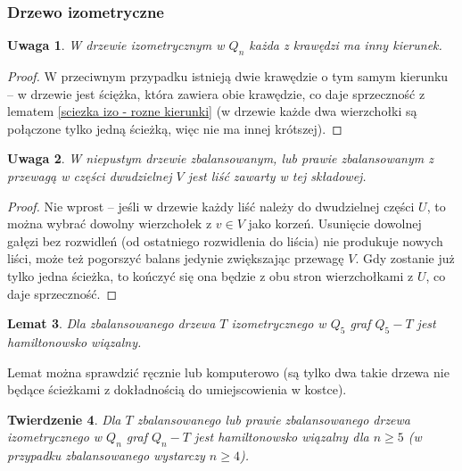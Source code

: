 \documentclass{pracamgr}
\newtheorem{theorem}{Twierdzenie}
\newtheorem{lemma}[theorem]{Lemat}
\newtheorem{remark}[theorem]{Uwaga}
\begin{document}
    \subsubsection{Drzewo izometryczne}
     \begin{remark}\label{drzewo izo - kierunek tylko raz}
      W drzewie izometrycznym w $Q_n$ każda z krawędzi ma inny kierunek.
     \end{remark}
     \begin{proof}
      W przeciwnym przypadku istnieją dwie krawędzie o tym samym kierunku -- w drzewie jest ściężka, która zawiera obie krawędzie, co daje sprzeczność z lematem
      \ref{sciezka izo - rozne kierunki} (w drzewie każde dwa wierzchołki są połączone tylko jedną ścieżką, więc nie ma innej krótszej).
     \end{proof}
     \begin{remark}\label{drzewo izo zbal - ma liść z V}
      W niepustym drzewie zbalansowanym, lub prawie zbalansowanym z przewagą w części dwudzielnej $V$ jest liść zawarty w tej składowej.
     \end{remark}
     \begin{proof}
      Nie wprost -- jeśli w drzewie każdy liść należy do dwudzielnej części $U$, to można wybrać dowolny wierzchołek z $v\in V$ jako korzeń.
      Usunięcie dowolnej gałęzi bez rozwidleń (od ostatniego rozwidlenia do liścia) nie produkuje nowych liści, może też pogorszyć balans jedynie
      zwiększając przewagę $V$. Gdy zostanie już tylko jedna ścieżka, to kończyć się ona będzie z obu stron wierzchołkami z $U$, co daje sprzeczność.
     \end{proof}
     \begin{lemma}\label{Q_5-izo tree hamilton}
      Dla zbalansowanego drzewa $T$ izometrycznego w $Q_5$ graf $Q_5-T$ jest hamiltonowsko wiązalny.
     \end{lemma}
     Lemat można sprawdzić ręcznie lub komputerowo (są tylko dwa takie drzewa nie będące ścieżkami z dokładnością do umiejscowienia w kostce).
     \begin{theorem}\label{Hamilton - drzewo izo}
      Dla $T$ zbalansowanego lub prawie zbalansowanego drzewa izometrycznego w $Q_n$ graf $Q_n-T$ jest hamiltonowsko wiązalny dla $n\ge5$
      (w przypadku zbalansowanego wystarczy $n\ge4$).
     \end{theorem}
\end{document}
